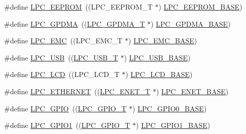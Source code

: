 \begin{DoxyCompactItemize}
\item 
\#define \hyperlink{group__PERIPH__177X__8X__BASE_ga3af7cc9a426f661ac4deee8a9997a830}{L\-P\-C\-\_\-\-E\-E\-P\-R\-O\-M}~((L\-P\-C\-\_\-\-E\-E\-P\-R\-O\-M\-\_\-\-T           $\ast$) \hyperlink{group__PERIPH__407X__8X__BASE_ga9d1fcaafb9feb0f8253c3cef1edc7e9f}{L\-P\-C\-\_\-\-E\-E\-P\-R\-O\-M\-\_\-\-B\-A\-S\-E})
\item 
\#define \hyperlink{group__PERIPH__177X__8X__BASE_gaf9d4b843ddff8d08a27880f90e2dbf18}{L\-P\-C\-\_\-\-G\-P\-D\-M\-A}~((\hyperlink{structLPC__GPDMA__T}{L\-P\-C\-\_\-\-G\-P\-D\-M\-A\-\_\-\-T}            $\ast$) \hyperlink{group__PERIPH__407X__8X__BASE_ga51ba8e3f33730fa2b78be3f892d8c278}{L\-P\-C\-\_\-\-G\-P\-D\-M\-A\-\_\-\-B\-A\-S\-E})
\item 
\#define \hyperlink{group__PERIPH__177X__8X__BASE_ga115afed5bd08559bbc4eba50e7c23495}{L\-P\-C\-\_\-\-E\-M\-C}~((L\-P\-C\-\_\-\-E\-M\-C\-\_\-\-T              $\ast$) \hyperlink{group__PERIPH__407X__8X__BASE_ga52f586bf3c6855ad4ef03b1fee3f2f0d}{L\-P\-C\-\_\-\-E\-M\-C\-\_\-\-B\-A\-S\-E})
\item 
\#define \hyperlink{group__PERIPH__177X__8X__BASE_gae77538a7f3f4850715c95283e38b423f}{L\-P\-C\-\_\-\-U\-S\-B}~((\hyperlink{structLPC__USB__T}{L\-P\-C\-\_\-\-U\-S\-B\-\_\-\-T}              $\ast$) \hyperlink{group__PERIPH__407X__8X__BASE_gaa619008881e9f76dc31131313eff1b79}{L\-P\-C\-\_\-\-U\-S\-B\-\_\-\-B\-A\-S\-E})
\item 
\#define \hyperlink{group__PERIPH__177X__8X__BASE_ga68cb24e38b29356c45f9bb634b35c677}{L\-P\-C\-\_\-\-L\-C\-D}~((L\-P\-C\-\_\-\-L\-C\-D\-\_\-\-T              $\ast$) \hyperlink{group__PERIPH__407X__8X__BASE_gae1746cd618a1eb4f24f95255594f159a}{L\-P\-C\-\_\-\-L\-C\-D\-\_\-\-B\-A\-S\-E})
\item 
\#define \hyperlink{group__PERIPH__177X__8X__BASE_gaddb977e4442891b21ced3344c71440d7}{L\-P\-C\-\_\-\-E\-T\-H\-E\-R\-N\-E\-T}~((\hyperlink{structLPC__ENET__T}{L\-P\-C\-\_\-\-E\-N\-E\-T\-\_\-\-T}             $\ast$) \hyperlink{group__PERIPH__407X__8X__BASE_ga73c18d53000abe3814c4b787cd83a57c}{L\-P\-C\-\_\-\-E\-N\-E\-T\-\_\-\-B\-A\-S\-E})
\item 
\#define \hyperlink{group__PERIPH__177X__8X__BASE_ga8fce6a072685922bf3ebc1aa9070f408}{L\-P\-C\-\_\-\-G\-P\-I\-O}~((\hyperlink{structLPC__GPIO__T}{L\-P\-C\-\_\-\-G\-P\-I\-O\-\_\-\-T}             $\ast$) \hyperlink{group__PERIPH__407X__8X__BASE_ga09e0e964ea1abf3b991772df2aa52405}{L\-P\-C\-\_\-\-G\-P\-I\-O0\-\_\-\-B\-A\-S\-E})
\item 
\#define \hyperlink{group__PERIPH__177X__8X__BASE_ga335587dad4e6d0da56c1f3ad1c087d10}{L\-P\-C\-\_\-\-G\-P\-I\-O1}~((\hyperlink{structLPC__GPIO__T}{L\-P\-C\-\_\-\-G\-P\-I\-O\-\_\-\-T}             $\ast$) \hyperlink{group__PERIPH__407X__8X__BASE_ga9fb0536853721a3073bd69d94d0b7ec2}{L\-P\-C\-\_\-\-G\-P\-I\-O1\-\_\-\-B\-A\-S\-E})

\end{DoxyCompactItemize}
